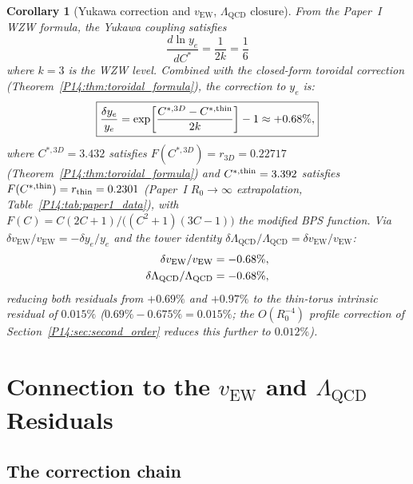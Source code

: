\documentclass[11pt,a4paper]{article}
\newtheorem{corollary}[theorem]{Corollary}
\theoremstyle{definition}
\theoremstyle{remark}
\newcommand{\vEW}{v_{\mathrm{EW}}}
\newcommand{\Rzero}{R_0}
\newcommand{\LQCD}{\Lambda_{\mathrm{QCD}}}
\begin{document}
\begin{corollary}[Yukawa correction and $\vEW$, $\LQCD$ closure]
\label{P14:cor:yukawa_3D}
From the Paper~I WZW formula, the Yukawa coupling satisfies
\begin{equation}
  \boxed{\frac{d\ln y_e}{dC^*} = \frac{1}{2k} = \frac{1}{6}}
  \label{P14:eq:dye_dCstar}
\end{equation}
where $k=3$ is the WZW level.
Combined with the closed-form toroidal correction
(Theorem~\ref{P14:thm:toroidal_formula}), the correction to $y_e$ is:
\begin{equation}
  \boxed{\frac{\delta y_e}{y_e}
  = \exp\!\left[\frac{C^{*,3D} - C^{*,{\rm thin}}}{2k}\right] - 1
  \approx +0.68\%,}
  \label{P14:eq:delta_ye}
\end{equation}
where $C^{*,3D}=3.432$ satisfies $F(C^{*,3D})=r_{3D}=0.22717$
(Theorem~\ref{P14:thm:toroidal_formula}) and
$C^{*,{\rm thin}}=3.392$ satisfies
$F(C^{*,{\rm thin}})=r_{\rm thin}=0.2301$
(Paper~I $\Rzero\to\infty$ extrapolation, Table~\ref{P14:tab:paper1_data}),
with $F(C)=C(2C+1)/\bigl((C^2+1)(3C-1)\bigr)$ the modified BPS function.
Via $\delta\vEW/\vEW = -\delta y_e/y_e$ and the tower identity
$\delta\LQCD/\LQCD = \delta\vEW/\vEW$:
\begin{align}
  \delta\vEW/\vEW &= -0.68\%, \notag \\
  \delta\LQCD/\LQCD &= -0.68\%, \notag
\end{align}
reducing both residuals from $+0.69\%$ and $+0.97\%$ to the
thin-torus intrinsic residual of $0.015\%$
($0.69\% - 0.675\% = 0.015\%$; the $O(\Rzero^{-4})$ profile
correction of Section~\ref{P14:sec:second_order} reduces this further
to $0.012\%$).
\end{corollary}

\section{Connection to the $\vEW$ and $\LQCD$ Residuals}
\label{P14:sec:connection}

\subsection{The correction chain}
\end{document}

